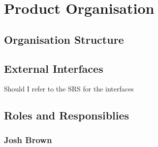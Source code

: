 
\chapter{Product Organisation} %

\label{Part6Chapter3} %



\section{Organisation Structure}




\section{External Interfaces}

Should I refer to the SRS for the interfaces


\section{Roles and Responsiblies}


\subsection{Josh Brown}

